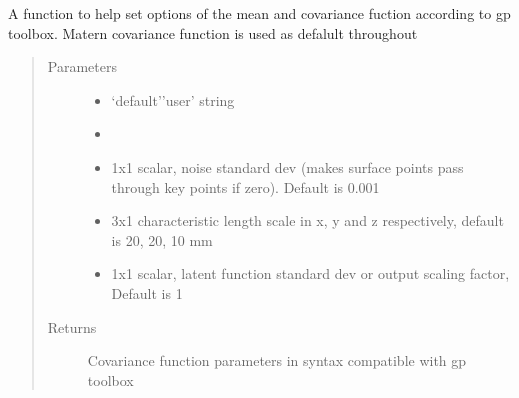 \documentclass[a4paper,10pt,english]{sphinxmanual}
\begin{document}
\begin{fulllineitems}
\label{\detokenize{index:mGRF.setCovStruct}}
A function to help set options of the mean and covariance fuction
according to gp toolbox. Matern covariance function is used as defalult
throughout
\begin{quote}\begin{description}
\item[{Parameters}] \leavevmode\begin{itemize}
\item {} 
 \textendash{} ‘default’\textbar{}’user’ string

\item {} 
 \textendash{} 

\item {} 
 \textendash{} 1x1 scalar, noise standard dev (makes surface points pass through key points if zero). Default is 0.001

\item {} 
 \textendash{} 3x1 characteristic length scale in x, y and z respectively, default is 20, 20, 10 mm

\item {} 
 \textendash{} 1x1 scalar, latent function standard dev or output scaling factor, Default is 1

\end{itemize}

\item[{Returns}] \leavevmode
Covariance function parameters in syntax compatible with gp toolbox

\end{description}\end{quote}

\end{fulllineitems}
\end{document}
